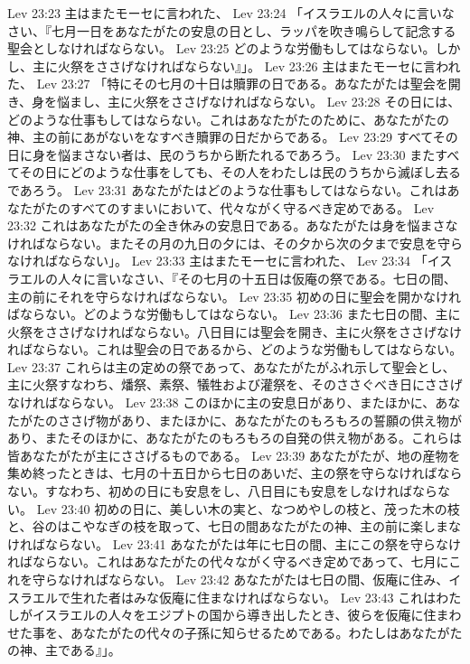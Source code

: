 Lev 23:23  主はまたモーセに言われた、
Lev 23:24  「イスラエルの人々に言いなさい、『七月一日をあなたがたの安息の日とし、ラッパを吹き鳴らして記念する聖会としなければならない。
Lev 23:25  どのような労働もしてはならない。しかし、主に火祭をささげなければならない』」。
Lev 23:26  主はまたモーセに言われた、
Lev 23:27  「特にその七月の十日は贖罪の日である。あなたがたは聖会を開き、身を悩まし、主に火祭をささげなければならない。
Lev 23:28  その日には、どのような仕事もしてはならない。これはあなたがたのために、あなたがたの神、主の前にあがないをなすべき贖罪の日だからである。
Lev 23:29  すべてその日に身を悩まさない者は、民のうちから断たれるであろう。
Lev 23:30  またすべてその日にどのような仕事をしても、その人をわたしは民のうちから滅ぼし去るであろう。
Lev 23:31  あなたがたはどのような仕事もしてはならない。これはあなたがたのすべてのすまいにおいて、代々ながく守るべき定めである。
Lev 23:32  これはあなたがたの全き休みの安息日である。あなたがたは身を悩まさなければならない。またその月の九日の夕には、その夕から次の夕まで安息を守らなければならない」。
Lev 23:33  主はまたモーセに言われた、
Lev 23:34  「イスラエルの人々に言いなさい、『その七月の十五日は仮庵の祭である。七日の間、主の前にそれを守らなければならない。
Lev 23:35  初めの日に聖会を開かなければならない。どのような労働もしてはならない。
Lev 23:36  また七日の間、主に火祭をささげなければならない。八日目には聖会を開き、主に火祭をささげなければならない。これは聖会の日であるから、どのような労働もしてはならない。
Lev 23:37  これらは主の定めの祭であって、あなたがたがふれ示して聖会とし、主に火祭すなわち、燔祭、素祭、犠牲および灌祭を、そのささぐべき日にささげなければならない。
Lev 23:38  このほかに主の安息日があり、またほかに、あなたがたのささげ物があり、またほかに、あなたがたのもろもろの誓願の供え物があり、またそのほかに、あなたがたのもろもろの自発の供え物がある。これらは皆あなたがたが主にささげるものである。
Lev 23:39  あなたがたが、地の産物を集め終ったときは、七月の十五日から七日のあいだ、主の祭を守らなければならない。すなわち、初めの日にも安息をし、八日目にも安息をしなければならない。
Lev 23:40  初めの日に、美しい木の実と、なつめやしの枝と、茂った木の枝と、谷のはこやなぎの枝を取って、七日の間あなたがたの神、主の前に楽しまなければならない。
Lev 23:41  あなたがたは年に七日の間、主にこの祭を守らなければならない。これはあなたがたの代々ながく守るべき定めであって、七月にこれを守らなければならない。
Lev 23:42  あなたがたは七日の間、仮庵に住み、イスラエルで生れた者はみな仮庵に住まなければならない。
Lev 23:43  これはわたしがイスラエルの人々をエジプトの国から導き出したとき、彼らを仮庵に住まわせた事を、あなたがたの代々の子孫に知らせるためである。わたしはあなたがたの神、主である』」。
